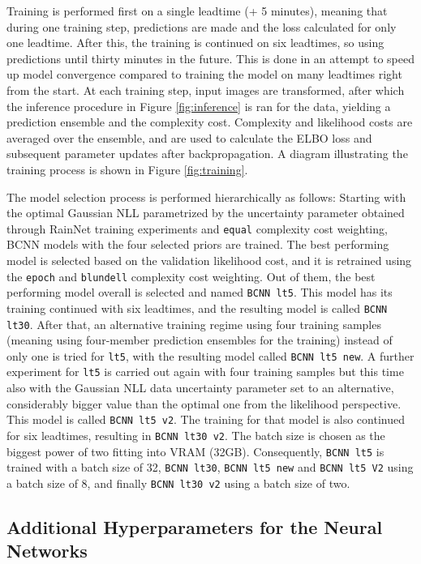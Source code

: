 Training is performed first on a single leadtime (+ 5 minutes), meaning that during one training step, predictions are made and the loss calculated for only one leadtime. After this, the training is continued on six leadtimes, so using predictions until thirty minutes in the future. This is done in an attempt to speed up model convergence compared to training the model on many leadtimes right from the start. At each training step, input images are transformed, after which the inference procedure in Figure \ref{fig:inference} is ran for the data, yielding a prediction ensemble and the complexity cost. Complexity and likelihood costs are averaged over the ensemble, and are used to calculate the ELBO loss and subsequent parameter updates after backpropagation. A diagram illustrating the training process is shown in Figure \ref{fig:training}. 

The model selection process is performed hierarchically as follows: Starting with the optimal Gaussian NLL parametrized by the uncertainty parameter obtained through RainNet training experiments and \texttt{equal} complexity cost weighting, BCNN models with the four selected priors are trained. The best performing model is selected based on the validation likelihood cost, and it is retrained using the \texttt{epoch} and \texttt{blundell} complexity cost weighting. Out of them, the best performing model overall is selected and named \texttt{BCNN lt5}. This model has its training continued with six leadtimes, and the resulting model is called \texttt{BCNN lt30}. After that, an alternative training regime using four training samples (meaning using four-member prediction ensembles for the training) instead of only one is tried for \texttt{lt5}, with the resulting model called \texttt{BCNN lt5 new}. A further experiment for \texttt{lt5} is carried out again with four training samples but this time also with the Gaussian NLL data uncertainty parameter set to an alternative, considerably bigger value than the optimal one from the likelihood perspective. This model is called \texttt{BCNN lt5 v2}. The training for that model is also continued for six leadtimes, resulting in \texttt{BCNN lt30 v2}. The batch size is chosen as the biggest power of two fitting into VRAM (32GB). 
Consequently, \texttt{BCNN lt5} is trained with a batch size of 32, \texttt{BCNN lt30}, \texttt{BCNN lt5 new} and \texttt{BCNN lt5 V2} using a batch size of 8, and finally \texttt{BCNN lt30 v2} using a batch size of two.

\subsection{Additional Hyperparameters for the Neural Networks}
\label{section:hyper}

